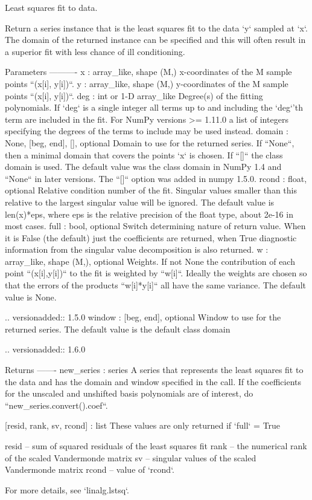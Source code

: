 \begin{DoxyVerb}Least squares fit to data.

Return a series instance that is the least squares fit to the data
`y` sampled at `x`. The domain of the returned instance can be
specified and this will often result in a superior fit with less
chance of ill conditioning.

Parameters
----------
x : array_like, shape (M,)
    x-coordinates of the M sample points ``(x[i], y[i])``.
y : array_like, shape (M,)
    y-coordinates of the M sample points ``(x[i], y[i])``.
deg : int or 1-D array_like
    Degree(s) of the fitting polynomials. If `deg` is a single integer
    all terms up to and including the `deg`'th term are included in the
    fit. For NumPy versions >= 1.11.0 a list of integers specifying the
    degrees of the terms to include may be used instead.
domain : {None, [beg, end], []}, optional
    Domain to use for the returned series. If ``None``,
    then a minimal domain that covers the points `x` is chosen.  If
    ``[]`` the class domain is used. The default value was the
    class domain in NumPy 1.4 and ``None`` in later versions.
    The ``[]`` option was added in numpy 1.5.0.
rcond : float, optional
    Relative condition number of the fit. Singular values smaller
    than this relative to the largest singular value will be
    ignored. The default value is len(x)*eps, where eps is the
    relative precision of the float type, about 2e-16 in most
    cases.
full : bool, optional
    Switch determining nature of return value. When it is False
    (the default) just the coefficients are returned, when True
    diagnostic information from the singular value decomposition is
    also returned.
w : array_like, shape (M,), optional
    Weights. If not None the contribution of each point
    ``(x[i],y[i])`` to the fit is weighted by ``w[i]``. Ideally the
    weights are chosen so that the errors of the products
    ``w[i]*y[i]`` all have the same variance.  The default value is
    None.

    .. versionadded:: 1.5.0
window : {[beg, end]}, optional
    Window to use for the returned series. The default
    value is the default class domain

    .. versionadded:: 1.6.0

Returns
-------
new_series : series
    A series that represents the least squares fit to the data and
    has the domain and window specified in the call. If the
    coefficients for the unscaled and unshifted basis polynomials are
    of interest, do ``new_series.convert().coef``.

[resid, rank, sv, rcond] : list
    These values are only returned if `full` = True

    resid -- sum of squared residuals of the least squares fit
    rank -- the numerical rank of the scaled Vandermonde matrix
    sv -- singular values of the scaled Vandermonde matrix
    rcond -- value of `rcond`.

    For more details, see `linalg.lstsq`.\end{DoxyVerb}
